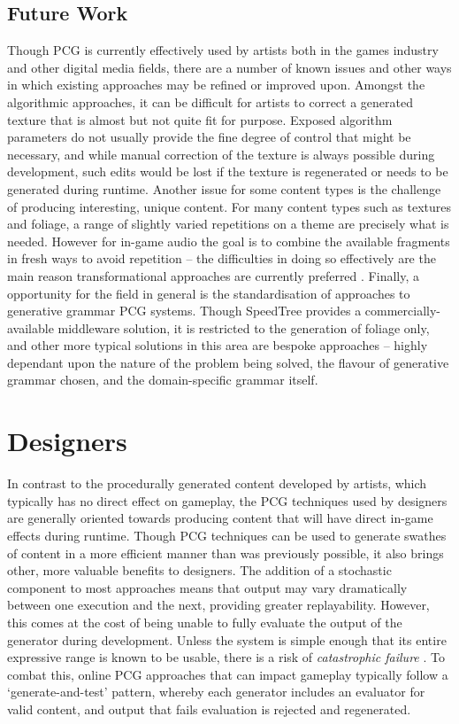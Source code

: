 \documentclass{acm_proc_article-sp}
\begin{document}
\subsection{Future Work}
Though PCG is currently effectively used by artists both in the games industry and other digital media fields, there are a number of known issues and other ways in which existing approaches may be refined or improved upon. Amongst the algorithmic approaches, it can be difficult for artists to correct a generated texture that is almost but not quite fit for purpose. Exposed algorithm parameters do not usually provide the fine degree of control that might be necessary, and while manual correction of the texture is always possible during development, such edits would be lost if the texture is regenerated or needs to be generated during runtime.
Another issue for some content types is the challenge of producing interesting, unique content. For many content types such as textures and foliage, a range of slightly varied repetitions on a theme are precisely what is needed. However for in-game audio the goal is to combine the available fragments in fresh ways to avoid repetition -- the difficulties in doing so effectively are the main reason transformational approaches are currently preferred \cite{collins2009introduction}.
Finally, a opportunity for the field in general is the standardisation of approaches to generative grammar PCG systems. Though SpeedTree provides a commercially-available middleware solution, it is restricted to the generation of foliage only, and other more typical solutions in this area are bespoke approaches -- highly dependant upon the nature of the problem being solved, the flavour of generative grammar chosen, and the domain-specific grammar itself.


\newpage
\section{Designers}
In contrast to the procedurally generated content developed by artists, which typically has no direct effect on gameplay, the PCG techniques used by designers are generally oriented towards producing content that will have direct in-game effects during runtime. Though PCG techniques can be used to generate swathes of content in a more efficient manner than was previously possible, it also brings other, more valuable benefits to designers. The addition of a stochastic component to most approaches means that output may vary dramatically between one execution and the next, providing greater replayability. However, this comes at the cost of being unable to fully evaluate the output of the generator during development. Unless the system is simple enough that its entire expressive range is known to be usable, there is a risk of \textit{catastrophic failure} \cite{togelius2011search}. To combat this, online PCG approaches that can impact gameplay typically follow a `generate-and-test' pattern, whereby each generator includes an evaluator for valid content, and output that fails evaluation is rejected and regenerated.
\end{document}
